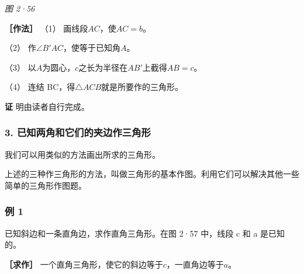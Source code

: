 \emph{图 2·56}

\textbf{［作法］} （1） 画线段\(AC\)，使\(AC = b\)。

（2） 作\(\angle B'AC\)，使等于已知角\(A\)。

（3） 以\(A\)为圆心，\(c\)之长为半径在\(AB'\)上截得\(AB = c\)。

（4） 连结 BC，得\(\triangle ACB\)就是所要作的三角形。

\textbf{证} 明由读者自行完成。

\subsubsection{3.
已知两角和它们的夹边作三角形}

我们可以用类似的方法画出所求的三角形。

上述的三种作三角形的方法，叫做三角形的基本作图。利用它们可以解决其他一些简单的三角形作图题。

\subsubsection{例 1}

已知斜边和一条直角边，求作直角三角形。在图 2·57 中，线段 c 和 a
是已知的。

\textbf{［求作］}
一个直角三角形，使它的斜边等于\(c\)，一直角边等于\(a\)。

